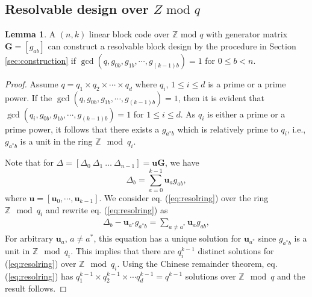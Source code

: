 \documentclass[journal,twocolumn]{IEEEtran}
\theoremstyle{definition}
\newtheorem{lemma}{Lemma}
\newcommand{\bfu}{\mathbf{u}}
\newcommand{\bfG}{\mathbf{G}}
\begin{document}
\subsection{Resolvable design over $Z\text{~mod~}q$}
\begin{lemma}
	\label{lemma:resol_ring}
	A $(n,k)$ linear block code over $\mathbb{Z} \text{~mod~}q$ with generator matrix $\bfG=[g_{ab}]$ can construct a resolvable block design by the procedure in Section \ref{sec:construction} if $\gcd(q,g_{0b},g_{1b},\cdots,g_{(k-1)b})=1$ for $0\le b<n$.%
\end{lemma}
\begin{proof}
    Assume $q=q_1\times q_2\times \cdots \times q_d$ where $q_i$, $1\le i\le d$ is a prime or a prime power. If the $\gcd(q,g_{0b}, g_{1b}, \cdots, g_{(k-1)b})=1$, then it is evident that $\gcd(q_i,g_{0b}, g_{1b},\cdots, g_{(k-1)b})=1$ for $1\le i\le d$. As $q_i$ is either a prime or a prime power, it follows that there exists a $g_{a^*b}$ which is relatively prime to $q_i$, i.e., $g_{a^*b}$ is a unit in the ring $\mathbb{Z} \mod q_i$.

    Note that for $\Delta = [\Delta_0 ~\Delta_1~ \dots~\Delta_{n-1}]= \bfu \bfG$, we have
	\begin{equation}
	\label{eq:resolring}
	\Delta_b = \sum_{a=0}^{k-1} \bfu_ag_{ab},
	\end{equation}
	where $\bfu=[\bfu_0,\cdots, \bfu_{k-1}]$. We consider eq. (\ref{eq:resolring}) over the ring $\mathbb{Z} \mod q_i$ and rewrite eq. (\ref{eq:resolring}) as
	\begin{align*}
	\Delta_b-\bfu_{a^*}g_{a^*b}=\sum_{a\neq a^*}\bfu_ag_{ab},
	\end{align*}
	For arbitrary $\bfu_a$, $a\neq a^*$, this equation has a unique solution for $\bfu_{a^*}$ since $g_{a^*b}$ is a unit in $\mathbb{Z} \mod q_i$. This implies that there are $q_i^{k-1}$ distinct solutions for (\ref{eq:resolring}) over $\mathbb{Z} \mod q_i$. Using the Chinese remainder theorem, eq. (\ref{eq:resolring}) has $q_1^{k-1}\times q_2^{k-1}\times \cdots q_d^{k-1}=q^{k-1}$ solutions over $\mathbb{Z} \mod q$ and the result follows.
\end{proof}
\end{document}
